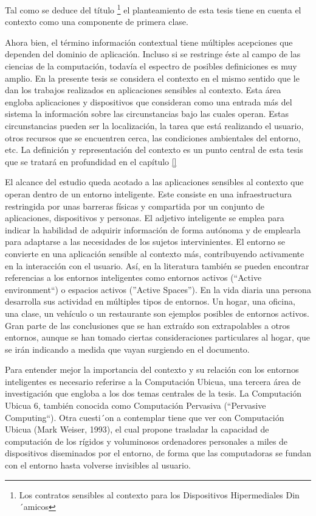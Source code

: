 Tal como se deduce del título \footnote{Los contratos sensibles al contexto
para los Dispositivos Hipermediales Din´amicos} el planteamiento de esta tesis
tiene en cuenta el contexto como una componente de primera clase.

Ahora bien, el término información contextual tiene múltiples acepciones
que dependen del dominio de aplicación. Incluso si se restringe éste al campo de
las ciencias de la computación, todavía el espectro de posibles definiciones es
muy amplio. En la presente tesis se considera el contexto en el mismo sentido
que le dan los trabajos realizados en aplicaciones sensibles al contexto. Esta
área engloba aplicaciones y dispositivos que consideran como una entrada más del
sistema la información sobre las circunstancias bajo las cuales operan. Estas
circunstancias pueden ser la localización, la tarea que está realizando el
usuario, otros recursos que se encuentren cerca, las condiciones ambientales del
entorno, etc. La definición y representación del contexto es un punto central de
esta tesis que se tratará en profundidad en el capítulo \ref{}

El alcance del estudio queda acotado a las aplicaciones sensibles al contexto
que operan dentro de un entorno inteligente. Este consiste en una
infraestructura restringida por unas barreras físicas y compartida por un
conjunto de aplicaciones, dispositivos y personas. El adjetivo inteligente se
emplea para indicar la habilidad de adquirir información de forma autónoma y de
emplearla para adaptarse a las necesidades de los sujetos intervinientes. El
entorno se convierte en una aplicación sensible al contexto más, contribuyendo
activamente en la interacción con el usuario. Así, en la literatura también se
pueden encontrar referencias a los entornos inteligentes como entornos activos
(``Active environment``) o espacios activos (''Active Spaces''). En la vida
diaria una persona desarrolla sus actividad en múltiples tipos de entornos. Un
hogar, una oficina, una clase, un vehículo o un restaurante son ejemplos
posibles de entornos activos. Gran parte de las conclusiones que se han extraído
son extrapolables a otros entornos, aunque se han tomado ciertas consideraciones
particulares al hogar, que se irán indicando a medida que vayan surgiendo en el
documento.

Para entender mejor la importancia del contexto y su relación con los entornos
inteligentes es necesario referirse a la Computación Ubicua, una tercera área de
investigación que engloba a los dos temas centrales de la tesis. La Computación
Ubicua 6, también conocida como Computación Pervasiva (``Pervasive
Computing``). Otra cuesti´on a contemplar tiene que ver con Computación Ubicua
(Mark Weiser, 1993), el cual propone trasladar la capacidad de computación de
los rígidos y voluminosos ordenadores personales a miles de dispositivos
diseminados por el entorno, de forma que las computadoras se fundan con el
entorno hasta volverse invisibles al usuario.

